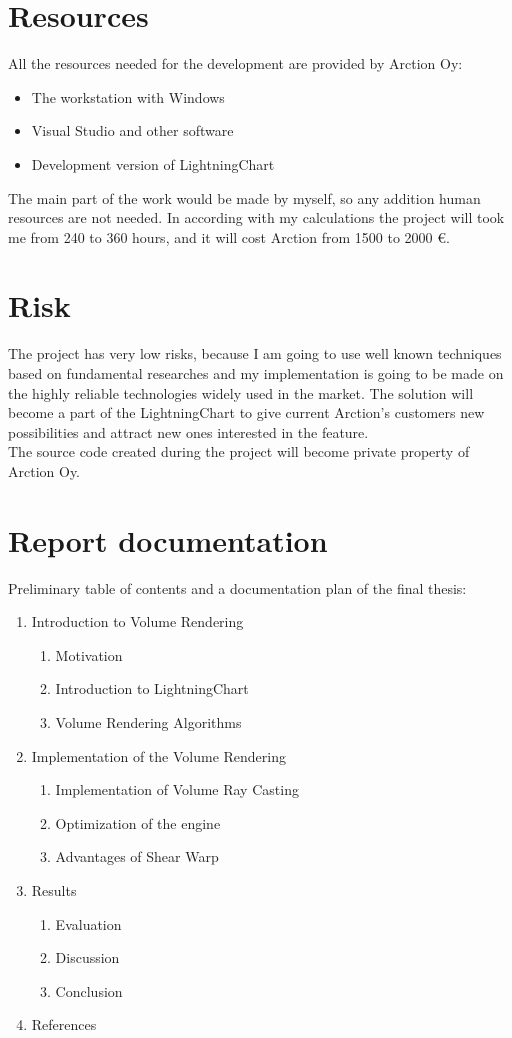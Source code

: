 \documentclass[english]{article}
\begin{document}
\section{Resources}
All the resources needed for the development are provided by Arction Oy:
\begin{itemize}
\item The workstation with Windows
\item Visual Studio and other software
\item Development version of LightningChart
\end{itemize}

The main part of the work would be made by myself, so any addition human resources are not needed.
In according with my calculations the project will took me from 240 to 360 hours, and it will cost Arction from 1500 to 2000 \euro.
\section{Risk}

The project has very low risks, because I am going to use well known techniques based on fundamental researches and my implementation is going to be made on the highly reliable technologies widely used in the market. The solution will become a part of the LightningChart to give current Arction's customers new possibilities and attract new ones interested in the feature.\\

The source code created during the project will become private property of Arction Oy.

\section{Report documentation}
Preliminary table of contents and a documentation plan of the final thesis:
\begin{enumerate}
\item Introduction to Volume Rendering 
\begin{enumerate}[label*=\arabic*] 
\item Motivation \item Introduction to LightningChart 
\item Volume Rendering Algorithms
 \end{enumerate}
\item Implementation of the Volume Rendering 
\begin{enumerate}[label*=\arabic*] 
\item Implementation of Volume Ray Casting 
\item Optimization of the engine 
\item Advantages of Shear Warp 
\end{enumerate}
\item Results
 \begin{enumerate}[label*=\arabic*] 
\item Evaluation 
\item Discussion 
\item Conclusion 
\end{enumerate}
\item References
\end{enumerate}
\end{document}
